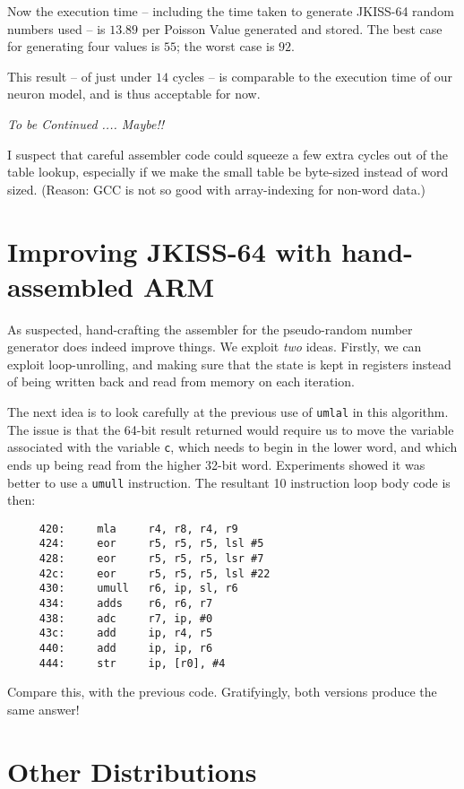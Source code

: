 Now the execution time -- including the time taken to generate
JKISS-64 random numbers used -- is $13.89$ per Poisson Value generated
and stored. The best case for generating four values is $55$; the
worst case is $92$.

This result -- of just under $14$ cycles -- is comparable to the
execution time of our neuron model, and is thus acceptable for now.

{\it To be Continued .... Maybe!!}

I suspect that careful assembler code could squeeze a few extra cycles
out of the table lookup, especially if we make the small table be
byte-sized instead of word sized. (Reason: GCC is not so good with
array-indexing for non-word data.)

\section{Improving JKISS-64 with hand-assembled ARM}

As suspected, hand-crafting the assembler for the pseudo-random number
generator does indeed improve things. We exploit {\em two}
ideas. Firstly, we can exploit loop-unrolling, and making sure that
the state is kept in registers instead of being written back and read
from memory on each iteration.

The next idea is to look carefully at the previous use of {\tt umlal}
in this algorithm. The issue is that the 64-bit result returned would
require us to move the variable associated with the variable {\tt c},
which needs to begin in the lower word, and which ends up being read
from the higher 32-bit word. Experiments showed it was better to use a
{\tt umull} instruction. The resultant 10 instruction loop body code is then:
\begin{verbatim}
     420:     mla     r4, r8, r4, r9
     424:     eor     r5, r5, r5, lsl #5
     428:     eor     r5, r5, r5, lsr #7
     42c:     eor     r5, r5, r5, lsl #22
     430:     umull   r6, ip, sl, r6
     434:     adds    r6, r6, r7
     438:     adc     r7, ip, #0
     43c:     add     ip, r4, r5
     440:     add     ip, ip, r6
     444:     str     ip, [r0], #4
\end{verbatim}
Compare this, with the previous code. Gratifyingly, both versions
produce the same answer!

\section{Other Distributions}

